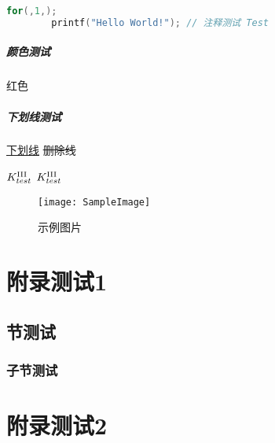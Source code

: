 \documentclass{../../PublicResources/DocClass}
\begin{document}
    \begin{lstlisting}[language={C},title={\textsf{C语言代码段测试}}]
        for(,1,);
        printf("Hello World!"); // 注释测试 Test
    \end{lstlisting}

    \paragraph{\color{black}颜色测试}
    {\color{red} 红色}

    \paragraph{下划线测试}
    \uline{下划线}
    \sout{删除线}


     $K_{test}^{\text{\Rmnum{3}}}$ $K_{test}^{\mathrm{\Rmnum{3}}}$

    \newpage
    \begin{figure}[h!]
        \centering
        \texttt{[image: SampleImage]}
        \caption{示例图片}
    \end{figure}

    \nocite{*} %
    \printbibliography %

    \appendix
    \chapter{附录测试1}
    \section{节测试}
    \subsection{子节测试}
    \chapter{附录测试2}
\end{document}
